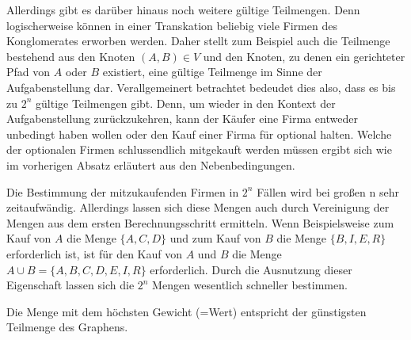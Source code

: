 Allerdings gibt es darüber hinaus noch weitere gültige Teilmengen. Denn logischerweise können in einer Transkation beliebig viele Firmen des Konglomerates erworben werden. Daher stellt zum Beispiel auch die Teilmenge bestehend aus den Knoten \((A, B) \in V\) und den Knoten, zu denen ein gerichteter Pfad von \(A\) oder \(B\) existiert, eine gültige Teilmenge im Sinne der Aufgabenstellung dar. Verallgemeinert betrachtet bedeudet dies also, dass es bis zu \(2^n\) gültige Teilmengen gibt. Denn, um wieder in den Kontext der Aufgabenstellung zurückzukehren, kann der Käufer eine Firma entweder unbedingt haben wollen oder den Kauf einer Firma für optional halten. Welche der optionalen Firmen schlussendlich mitgekauft werden müssen ergibt sich wie im vorherigen Absatz erläutert aus den Nebenbedingungen.

Die Bestimmung der mitzukaufenden Firmen in \(2^n\) Fällen wird bei großen n sehr zeitaufwändig. Allerdings lassen sich diese Mengen auch durch Vereinigung der Mengen aus dem ersten Berechnungsschritt ermitteln. Wenn Beispielsweise zum Kauf von \(A\) die Menge \(\{A, C, D\}\) und zum Kauf von \(B\) die Menge \(\{B, I, E, R\}\) erforderlich ist, ist für den Kauf von \(A\) und \(B\) die Menge \(A \cup B = \{A, B, C, D, E, I, R\}\) erforderlich. Durch die Ausnutzung dieser Eigenschaft lassen sich die \(2^n\) Mengen wesentlich schneller bestimmen.

Die Menge mit dem höchsten Gewicht (=Wert) entspricht der günstigsten Teilmenge des Graphens.